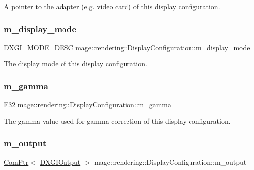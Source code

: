 A pointer to the adapter (e.\+g. video card) of this display configuration. \hypertarget{classmage_1_1rendering_1_1_display_configuration_a577ada006ada1b1e65a8deb817f0dafe}{}\label{classmage_1_1rendering_1_1_display_configuration_a577ada006ada1b1e65a8deb817f0dafe} 
\subsubsection{\texorpdfstring{m\+\_\+display\+\_\+mode}{m\_display\_mode}}
{\footnotesize\ttfamily D\+X\+G\+I\+\_\+\+M\+O\+D\+E\+\_\+\+D\+E\+SC mage\+::rendering\+::\+Display\+Configuration\+::m\+\_\+display\+\_\+mode\hspace{0.3cm}{\ttfamily [private]}}

The display mode of this display configuration. \hypertarget{classmage_1_1rendering_1_1_display_configuration_ac01844bb757c13e438c9ef3281becd4e}{}\label{classmage_1_1rendering_1_1_display_configuration_ac01844bb757c13e438c9ef3281becd4e} 
\subsubsection{\texorpdfstring{m\+\_\+gamma}{m\_gamma}}
{\footnotesize\ttfamily \hyperlink{namespacemage_aa97e833b45f06d60a0a9c4fc22ae02c0}{F32} mage\+::rendering\+::\+Display\+Configuration\+::m\+\_\+gamma\hspace{0.3cm}{\ttfamily [private]}}

The gamma value used for gamma correction of this display configuration. \hypertarget{classmage_1_1rendering_1_1_display_configuration_a3f43cbe5bb1a1a7c1bfb9ce66052fe0a}{}\label{classmage_1_1rendering_1_1_display_configuration_a3f43cbe5bb1a1a7c1bfb9ce66052fe0a} 
\subsubsection{\texorpdfstring{m\+\_\+output}{m\_output}}
{\footnotesize\ttfamily \hyperlink{namespacemage_ae74f374780900893caa5555d1031fd79}{Com\+Ptr}$<$ \hyperlink{namespacemage_1_1rendering_aaf22d3893277a4bd8497f6ea69b01532}{D\+X\+G\+I\+Output} $>$ mage\+::rendering\+::\+Display\+Configuration\+::m\+\_\+output\hspace{0.3cm}{\ttfamily [private]}}

